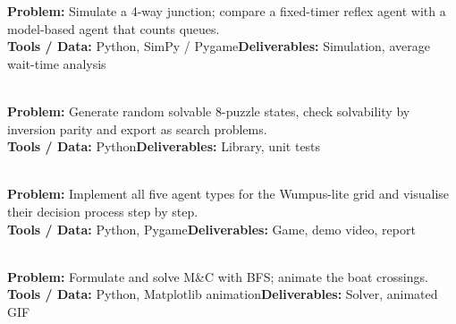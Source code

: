 \documentclass[11pt]{article}
\begin{document}
\begin{tcolorbox}[enhanced,breakable,colback=white,colframe=crimson,arc=2mm,boxrule=0.9pt,
  title={\textbf{PI.06\quad Traffic-Signal Reflex vs Model Agent}\hfill \colorbox{white}{\textcolor{crimson}{\scriptsize\bfseries MAJOR}}},fonttitle=\color{white},colbacktitle=crimson]
\textbf{\color{navy}Problem:} Simulate a 4-way junction; compare a fixed-timer reflex agent with a model-based agent that counts queues.\\[2pt]
\textbf{\color{navy}Tools / Data:} Python, SimPy / Pygame\qquad \textbf{\color{navy}Deliverables:} Simulation, average wait-time analysis\\[2pt]
\ 
\end{tcolorbox}
\begin{tcolorbox}[enhanced,breakable,colback=white,colframe=teal,arc=2mm,boxrule=0.9pt,
  title={\textbf{PI.07\quad 8-Puzzle Problem Formulator}\hfill \colorbox{white}{\textcolor{teal}{\scriptsize\bfseries MINI}}},fonttitle=\color{white},colbacktitle=teal]
\textbf{\color{navy}Problem:} Generate random solvable 8-puzzle states, check solvability by inversion parity and export as search problems.\\[2pt]
\textbf{\color{navy}Tools / Data:} Python\qquad \textbf{\color{navy}Deliverables:} Library, unit tests\\[2pt]
\ 
\end{tcolorbox}
\begin{tcolorbox}[enhanced,breakable,colback=white,colframe=crimson,arc=2mm,boxrule=0.9pt,
  title={\textbf{PI.08\quad Agent Architecture Playground}\hfill \colorbox{white}{\textcolor{crimson}{\scriptsize\bfseries MAJOR}}},fonttitle=\color{white},colbacktitle=crimson]
\textbf{\color{navy}Problem:} Implement all five agent types for the Wumpus-lite grid and visualise their decision process step by step.\\[2pt]
\textbf{\color{navy}Tools / Data:} Python, Pygame\qquad \textbf{\color{navy}Deliverables:} Game, demo video, report\\[2pt]
\ 
\end{tcolorbox}
\begin{tcolorbox}[enhanced,breakable,colback=white,colframe=teal,arc=2mm,boxrule=0.9pt,
  title={\textbf{PI.09\quad Missionaries and Cannibals Solver}\hfill \colorbox{white}{\textcolor{teal}{\scriptsize\bfseries MINI}}},fonttitle=\color{white},colbacktitle=teal]
\textbf{\color{navy}Problem:} Formulate and solve M\&C with BFS; animate the boat crossings.\\[2pt]
\textbf{\color{navy}Tools / Data:} Python, Matplotlib animation\qquad \textbf{\color{navy}Deliverables:} Solver, animated GIF\\[2pt]
\ 
\end{tcolorbox}
\end{document}
